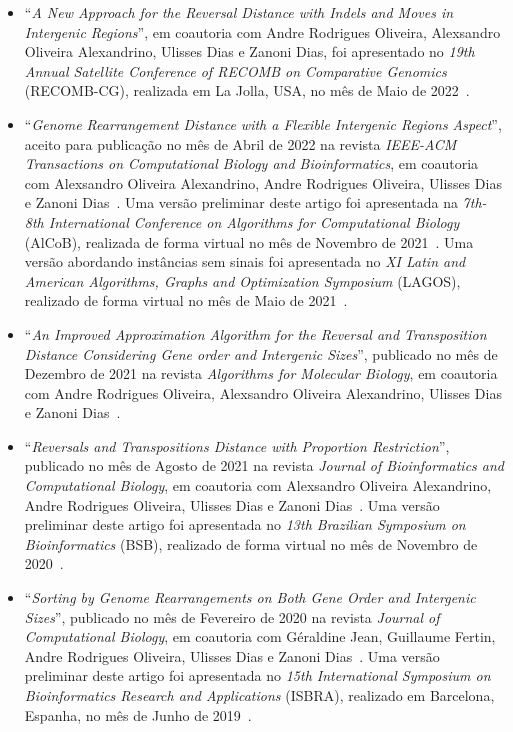 \begin{itemize}
  \item ``\textit{A New Approach for the Reversal Distance with Indels and Moves in Intergenic Regions}'', em coautoria com Andre Rodrigues Oliveira, Alexsandro Oliveira Alexandrino, Ulisses Dias e Zanoni Dias, foi apresentado no \textit{19th Annual Satellite Conference of RECOMB on Comparative Genomics} (RECOMB-CG), realizada em La Jolla, USA, no mês de Maio de 2022~\cite{2022b-brito-etal}.

  \item ``\textit{Genome Rearrangement Distance with a Flexible Intergenic Regions Aspect}'', aceito para publicação no mês de Abril de 2022 na revista \textit{IEEE-ACM Transactions on Computational Biology and Bioinformatics}, em coautoria com Alexsandro Oliveira Alexandrino, Andre Rodrigues Oliveira, Ulisses Dias e Zanoni Dias~\cite{2022a-brito-etal}. Uma versão preliminar deste artigo foi apresentada na \textit{7th-8th International Conference on Algorithms for Computational Biology} (AlCoB), realizada de forma virtual no mês de Novembro de 2021~\cite{2021c-brito-etal}. Uma versão abordando instâncias sem sinais foi apresentada no \textit{XI Latin and American Algorithms, Graphs and Optimization Symposium} (LAGOS), realizado de forma virtual no mês de Maio de 2021~\cite{2021d-brito-etal}.

  \item ``\textit{An Improved Approximation Algorithm for the Reversal and Transposition Distance Considering Gene order and Intergenic Sizes}'', publicado no mês de Dezembro de 2021 na revista \textit{Algorithms for Molecular Biology}, em coautoria com Andre Rodrigues Oliveira, Alexsandro Oliveira Alexandrino, Ulisses Dias e Zanoni Dias~\cite{2021b-brito-etal}.

  \item ``\textit{Reversals and Transpositions Distance with Proportion Restriction}'', publicado no mês de Agosto de 2021 na revista \textit{Journal of Bioinformatics and Computational Biology}, em coautoria com Alexsandro Oliveira Alexandrino, Andre Rodrigues Oliveira, Ulisses Dias e Zanoni Dias~\cite{2021a-brito-etal}. Uma versão preliminar deste artigo foi apresentada no \textit{13th Brazilian Symposium on Bioinformatics} (BSB), realizado de forma virtual no mês de Novembro de 2020~\cite{2020c-brito-etal}.

  \item ``\textit{Sorting by Genome Rearrangements on Both Gene Order and Intergenic Sizes}'', publicado no mês de Fevereiro de 2020 na revista \textit{Journal of Computational Biology}, em coautoria com Géraldine Jean, Guillaume Fertin, Andre Rodrigues Oliveira, Ulisses Dias e Zanoni Dias~\cite{2020a-brito-etal}. Uma versão preliminar deste artigo foi apresentada no \textit{15th International Symposium on Bioinformatics Research and Applications} (ISBRA), realizado em Barcelona, Espanha, no mês de Junho de 2019~\cite{2019-brito-etal}.
\end{itemize}

